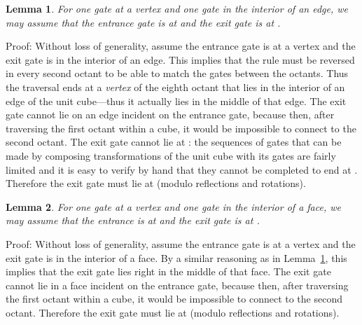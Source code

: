 \documentclass[11pt,a4paper]{article}
\newtheorem{lemma}{Lemma}
\newenvironment{proof}{Proof:}{\qed}
\def\squareforqed{\hbox{\rlap{}}}
\def\qed{\ifmmode\squareforqed\else{\unskip\nobreak\hfil
\penalty50\hskip1em\null\nobreak\hfil\squareforqed
\parfillskip=0pt\finalhyphendemerits=0\endgraf}\fi}
\begin{document}
\begin{lemma}\label{lem:vertex-edge-gates}
For one gate at a vertex and one gate in the interior of an edge, we may assume that the entrance gate is at  and the exit gate is at .
\end{lemma}
\begin{proof}
Without loss of generality, assume the entrance gate is at a vertex and the exit gate is in the interior of an edge. This implies that the rule must be reversed in every second octant to be able to match the gates between the octants. Thus the traversal ends at a \emph{vertex} of the eighth octant that lies in the interior of an edge of the unit cube---thus it actually lies in the middle of that edge. The exit gate cannot lie on an edge incident on the entrance gate, because then, after traversing the first octant within a cube, it would be impossible to connect to the second octant. The exit gate cannot lie at : the sequences of gates  that can be made by composing transformations of the unit cube with its gates are fairly limited and it is easy to verify by hand that they cannot be completed to end at . Therefore the exit gate must lie at  (modulo reflections and rotations).
\end{proof}

\begin{lemma}\label{lem:vertex-face-gates}
For one gate at a vertex and one gate in the interior of a face, we may assume that the entrance is at  and the exit gate is at .
\end{lemma}
\begin{proof}
Without loss of generality, assume the entrance gate is at a vertex and the exit gate is in the interior of a face. By a similar reasoning as in Lemma~\ref{lem:vertex-edge-gates}, this implies that the exit gate lies right in the middle of that face. The exit gate cannot lie in a face incident on the entrance gate, because then, after traversing the first octant within a cube, it would be impossible to connect to the second octant. Therefore the exit gate must lie at  (modulo reflections and rotations).
\end{proof}
\end{document}
